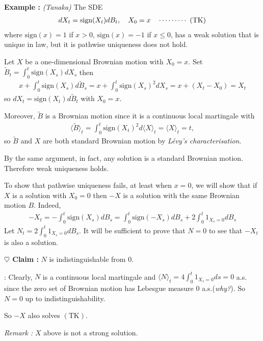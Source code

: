 \documentclass[12pt,a4paper]{article}
\newenvironment{proof}
{\begin{changemargin}{0.5cm}{0.5cm} 
	}%
	{\end{changemargin}
}
\newenvironment{subproof}
{\begin{changemargin}{0.5cm}{0.5cm} 
	}%
	{\end{changemargin}
}
\newenvironment{p}
{\begin{proof} 
	}%
	{\end{proof}
}
\begin{document}
\textbf{Example :} \emph{(Tanaka)} The SDE
\begin{align*}
dX_t = \text{sign}(X_t) dB_t, \quad X_0=x \quad \cdots\cdots\cdots\,\,(\text{TK})
\end{align*}
where $\text{sign}(x) = 1$ if $x>0$, $\text{sign}(x) =-1$ if $x\leq 0$, has a weak solution that is unique in law, but it is pathwise uniqueness does not hold. 
\begin{p}
\pf Let $X$ be a one-dimensional Brownian motion with $X_0 =x$. Set $\tilde{B}_t = \int_0^t \text{sign}(X_s) dX_s$ then
\begin{align*}
x+ \int_0^t \text{sign}(X_s) d\tilde{B}_s = x+ \int_0^t \text{sign}(X_s)^2 dX_s = x + (X_t - X_0) =X_t
\end{align*}
so $dX_t = \text{sign}(X_t) d\tilde{B}_t$ with $X_0 =x$.

\quad Moreover, $\tilde{B}$ is a Brownian motion since it is a continuous local martingale with
\begin{align*}
\langle \tilde{B} \rangle_t = \int_0^t \text{sign}(X_t)^2 d\langle X\rangle_t  = \langle X\rangle_t =t,
\end{align*} 
so $\tilde{B}$ and $X$ are both standard Brownian motion by \emph{L\'evy's characterisation}.

\quad By the same argument, in fact, any solution is a standard Brownian motion. Therefore weak uniqueness holds.
\s

To show that pathwise uniqueness fails, at least when $x=0$, we will show that if $X$ is a solution with $X_0 =0$ then $-X$ is a solution with the same Brownian motion $B$. Indeed,
\begin{align*}
-X_t = -\int_0^t \text{sign}(X_s) dB_s = \int_0^t \text{sign}(-X_s) dB_s + 2\int_0^t 1_{X_s =0} dB_s
\end{align*}
Let $N_t = 2\int_0^t 1_{X_s =0} dB_s$. It will be sufficient to prove that $N =0$ to see that $-X_t$ is also a solution.

\textbf{$\heartsuit$ Claim :} $N$ is indistinguishable from 0.
\begin{subproof}
: Clearly, $N$ is a continuous local martingale and $\langle N \rangle_t = 4\int_0^t 1_{X_s =0} ds=0$ a.s. since the zero set of Brownian motion has Lebesgue measure 0 a.s.(\emph{why?}). So $N=0$ up to indistinguishability.
\end{subproof}
So $-X$ also solves $(\text{TK})$.

\eop
\end{p}
\s

\emph{Remark :} $X$ above is not a strong solution.
\s
\end{document}
